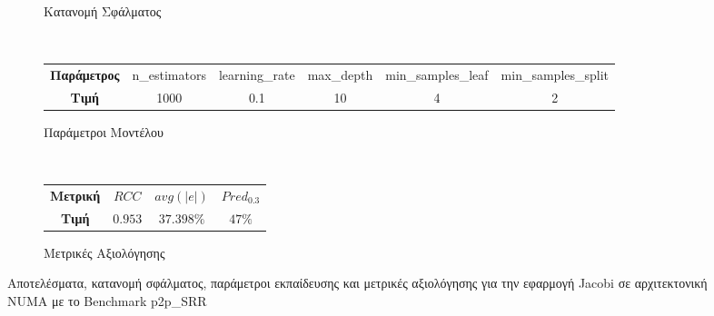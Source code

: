 \begin{figure}
\begin{subfigure}[b]{0.47\textwidth}
        \caption{Κατανομή Σφάλματος}
    \end{subfigure} 
    \\[0.2cm]
    \begin{subfigure}[b]{\textwidth}
   	 	\scriptsize
		\begin{tabular}{c||c|c|c|c|c}
			\textbf{Παράμετρος} & n\_estimators & learning\_rate & max\_depth & min\_samples\_leaf & min\_samples\_split \\
			\textbf{Τιμή}       &       1000        &  0.1               & 10          &  4                  &    2
		\end{tabular}
		\caption{Παράμετροι Μοντέλου}
    \end{subfigure}
    \\[0.2cm]
    \begin{subfigure}[b]{\textwidth}
    		\centering
   	 	\scriptsize
		\begin{tabular}{c||c|c|c}
			\textbf{Μετρική} & $RCC$ &   $avg(|e|)$ & $Pred_{0.3}$  \\
			\textbf{Τιμή}  &  $0.953$   &      $37.398\%
			$        &  $47\%$                                         
		\end{tabular}
		\caption{Μετρικές Αξιολόγησης}
    \end{subfigure}
    
        \caption{Αποτελέσματα, κατανομή σφάλματος, παράμετροι εκπαίδευσης και μετρικές αξιολόγησης για την εφαρμογή Jacobi σε αρχιτεκτονική NUMA με το Benchmark p2p\_SRR}
    \label{fig:NB_jacobi_NUMA}
\end{figure}
